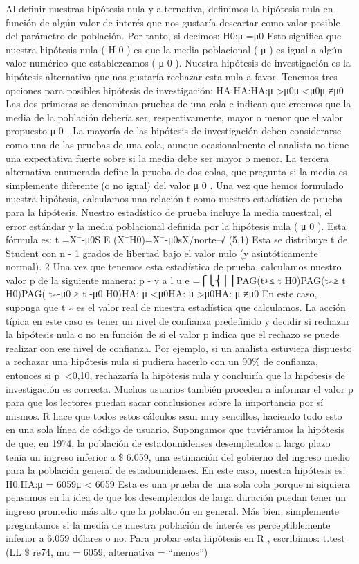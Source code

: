 \documentclass[
]{book}
\begin{document}
Al definir nuestras hipótesis nula y alternativa, definimos la hipótesis nula en función de algún valor de interés que nos gustaría descartar como valor posible del parámetro de población. Por tanto, si decimos:
H0:μ =μ0
Esto significa que nuestra hipótesis nula ( H 0 ) es que la media poblacional ( μ ) es igual a algún valor numérico que establezcamos ( μ 0 ). Nuestra hipótesis de investigación es la hipótesis alternativa que nos gustaría rechazar esta nula a favor. Tenemos tres opciones para posibles hipótesis de investigación:
HA:HA:HA:μ \textgreater μ0μ \textless μ0μ ≠μ0
Las dos primeras se denominan pruebas de una cola e indican que creemos que la media de la población debería ser, respectivamente, mayor o menor que el valor propuesto μ 0 . La mayoría de las hipótesis de investigación deben considerarse como una de las pruebas de una cola, aunque ocasionalmente el analista no tiene una expectativa fuerte sobre si la media debe ser mayor o menor. La tercera alternativa enumerada define la prueba de dos colas, que pregunta si la media es simplemente diferente (o no igual) del valor μ 0 .
Una vez que hemos formulado nuestra hipótesis, calculamos una relación t como nuestro estadístico de prueba para la hipótesis. Nuestro estadístico de prueba incluye la media muestral, el error estándar y la media poblacional definida por la hipótesis nula ( μ 0 ). Esta fórmula es:
t =X¯-μ0S E (X¯\textbar H0)=X¯-μ0sX/norte--√
(5,1)
Esta se distribuye t de Student con n - 1 grados de libertad bajo el valor nulo (y asintóticamente normal). 2 Una vez que tenemos esta estadística de prueba, calculamos nuestro valor p de la siguiente manera:
p - v a l u e =⎧⎩⎨⎪⎪PAG(t∗≤ t \textbar H0)PAG(t∗≥ t \textbar H0)PAG( \textbar t∗-μ0\textbar{} ≥ \textbar{} t -μ0\textbar{} \textbar H0)HA: μ \textless μ0HA: μ \textgreater μ0HA: μ ≠μ0
En este caso, suponga que t ∗ es el valor real de nuestra estadística que calculamos. La acción típica en este caso es tener un nivel de confianza predefinido y decidir si rechazar la hipótesis nula o no en función de si el valor p indica que el rechazo se puede realizar con ese nivel de confianza. Por ejemplo, si un analista estuviera dispuesto a rechazar una hipótesis nula si pudiera hacerlo con un 90\% de confianza, entonces si p  \textless0,10, rechazaría la hipótesis nula y concluiría que la hipótesis de investigación es correcta. Muchos usuarios también proceden a informar el valor p para que los lectores puedan sacar conclusiones sobre la importancia por sí mismos.
R hace que todos estos cálculos sean muy sencillos, haciendo todo esto en una sola línea de código de usuario. Supongamos que tuviéramos la hipótesis de que, en 1974, la población de estadounidenses desempleados a largo plazo tenía un ingreso inferior a \$ 6.059, una estimación del gobierno del ingreso medio para la población general de estadounidenses. En este caso, nuestra hipótesis es:
H0:HA:μ = 6059μ \textless{} 6059
Esta es una prueba de una sola cola porque ni siquiera pensamos en la idea de que los desempleados de larga duración puedan tener un ingreso promedio más alto que la población en general. Más bien, simplemente preguntamos si la media de nuestra población de interés es perceptiblemente inferior a 6.059 dólares o no. Para probar esta hipótesis en R , escribimos:
t.test (LL \$ re74, mu = 6059, alternativa = ``menos'')
\end{document}
